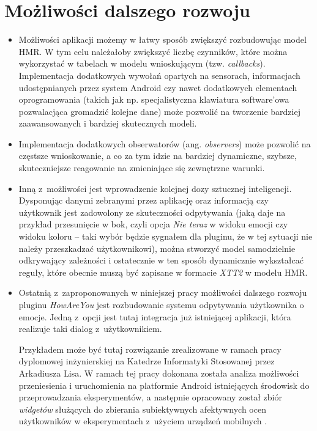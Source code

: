 
\section{Możliwości dalszego rozwoju}
\label{sec:mozwliwosciDalszegoRozwoju}


\begin{itemize}
	\item Możliwości aplikacji możemy w łatwy sposób zwiększyć rozbudowując model HMR. W tym celu należałoby zwiększyć liczbę czynników, które można wykorzystać w tabelach w modelu wnioskującym (tzw. \textit{callbacks}). Implementacja dodatkowych wywołań opartych na sensorach, informacjach udostępnianych przez system Android czy nawet dodatkowych elementach oprogramowania (takich jak np. specjalistyczna klawiatura software'owa pozwalacjąca gromadzić kolejne dane) może pozwolić na tworzenie bardziej zaawansowanych i bardziej skutecznych modeli.
	
	\item Implementacja dodatkowych obserwatorów (ang. \textit{observers}) może pozwolić na częstsze wnioskowanie, a co za tym idzie na bardziej dynamiczne, szybsze, skuteczniejsze reagowanie na zmieniające się zewnętrzne warunki.
	
	\item Inną z~możliwości jest wprowadzenie kolejnej dozy sztucznej inteligencji. Dysponując danymi zebranymi przez aplikację oraz informacją czy użytkownik jest zadowolony ze skuteczności odpytywania (jaką daje na przykład przesunięcie w bok, czyli opcja \textit{Nie teraz} w widoku emocji czy widoku koloru -- taki wybór będzie sygnałem dla pluginu, że w tej sytuacji nie należy przeszkadzać użytkownikowi), można stworzyć model samodzielnie odkrywający zależności i ostatecznie w ten sposób dynamicznie wykształcać reguły, które obecnie muszą być zapisane w formacie \textit{XTT2} w modelu HMR.
	
	\item Ostatnią z~zaproponowanych w niniejszej pracy możliwości dalszego rozwoju pluginu \textit{HowAreYou} jest rozbudowanie systemu odpytywania użytkownika o emocje. Jedną z~opcji jest tutaj integracja już istniejącej aplikacji, która realizuje taki dialog z~użytkownikiem. 
	
	Przykładem może być tutaj rozwiązanie zrealizowane w ramach pracy dyplomowej inżynierskiej na Katedrze Informatyki Stosowanej przez Arkadiusza Lisa. W ramach tej pracy dokonana została analiza możliwości przeniesienia i uruchomienia na platformie Android istniejących środowisk do przeprowadzania eksperymentów, a następnie	opracowany został zbiór \textit{widgetów} służących do zbierania subiektywnych afektywnych ocen użytkowników w eksperymentach z~użyciem urządzeń mobilnych \cite{ArkadiuszLis}.
	

\end{itemize}

